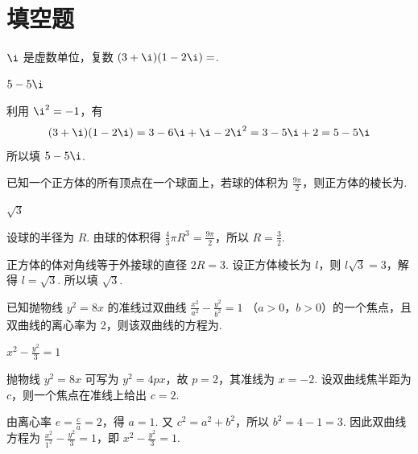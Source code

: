\section{填空题}

\begin{problem}
\(\i\) 是虚数单位，复数 \( (3+\i)(1-2\i)= \)\fillinblank{}.
\end{problem}

\begin{answer}
\(5-5\i\)
\end{answer}

\begin{solution}
利用 \(\i^2=-1\)，有
\[
(3+\i)(1-2\i)=3-6\i+\i-2\i^2=3-5\i+2=5-5\i
\]
所以填 \(5-5\i\).
\end{solution}

\begin{problem}
已知一个正方体的所有顶点在一个球面上，若球的体积为 \(\frac{9\pi}{2}\)，则正方体的棱长为\fillinblank{}.
\end{problem}

\begin{answer}
\(\sqrt{3}\)
\end{answer}

\begin{solution}
设球的半径为 \(R\). 由球的体积得
\(\frac{4}{3}\pi R^3=\frac{9\pi}{2}\)，所以 \(R=\frac{3}{2}\).

正方体的体对角线等于外接球的直径 \(2R=3\). 设正方体棱长为 \(l\)，则
\(l\sqrt{3}=3\)，解得 \(l=\sqrt{3}\). 所以填 \(\sqrt{3}\).
\end{solution}

\begin{problem}
已知抛物线 \( y^{2} = 8x \) 的准线过双曲线 \( \frac{x^2}{a^2} - \frac{y^2}{b^2} = 1  \) （\(a > 0\)，\(b > 0\)）的一个焦点，且双曲线的离心率为 2，则该双曲线的方程为\fillinblank{}.
\end{problem}

\begin{answer}
\(x^2-\frac{y^2}{3}=1\)
\end{answer}

\begin{solution}
抛物线 \(y^2=8x\) 可写为 \(y^2=4px\)，故 \(p=2\)，其准线为 \(x=-2\). 设双曲线焦半距为 \(c\)，则一个焦点在准线上给出 \(c=2\).

由离心率 \(e=\frac{c}{a}=2\)，得 \(a=1\). 又 \(c^2=a^2+b^2\)，所以 \(b^2=4-1=3\). 因此双曲线方程为
\(\frac{x^2}{1^2}-\frac{y^2}{3}=1\)，即 \(x^2-\frac{y^2}{3}=1\).
\end{solution}

